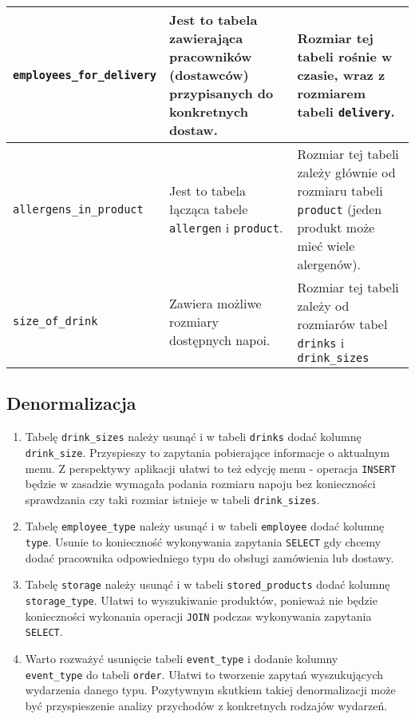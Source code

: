 \documentclass[12pt]{article}
\begin{document}
\begin{longtable}{|p{8em}|p{9em}|p{15em}|}
    \hline
    \texttt{employees\_for\_}\newline\texttt{delivery} & Jest to tabela zawierająca pracowników (dostawców) przypisanych do konkretnych dostaw. & Rozmiar tej tabeli rośnie w czasie, wraz z rozmiarem tabeli \texttt{delivery}. \\
    \hline
    \texttt{allergens\_in\_}\newline\texttt{product} & Jest to tabela łącząca tabele \texttt{allergen} i \texttt{product}. & Rozmiar tej tabeli zależy głównie od rozmiaru tabeli \texttt{product} (jeden produkt może mieć wiele alergenów).  \\
    \hline
    \texttt{size\_of\_drink} & Zawiera możliwe rozmiary dostępnych napoi. & Rozmiar tej tabeli zależy od rozmiarów tabel \texttt{drinks} i \texttt{drink\_sizes} \\
    \hline
\end{longtable}

\pagebreak

\subsection{Denormalizacja}
\begin{enumerate}
    \item Tabelę \texttt{drink\_sizes} należy usunąć i w tabeli \texttt{drinks} dodać kolumnę \texttt{drink\_size}. Przyspieszy to zapytania pobierające informacje o aktualnym menu. Z perspektywy aplikacji ułatwi to też edycję menu - operacja \texttt{INSERT} będzie w zasadzie wymagała podania rozmiaru napoju bez konieczności sprawdzania czy taki rozmiar istnieje w tabeli \texttt{drink\_sizes}.
    
    \item Tabelę \texttt{employee\_type} należy usunąć i w tabeli \texttt{employee} dodać kolumnę \texttt{type}. Usunie to konieczność wykonywania zapytania \texttt{SELECT} gdy chcemy dodać pracownika odpowiedniego typu do obsługi zamówienia lub dostawy.
    
    \item Tabelę \texttt{storage} należy usunąć i w tabeli \texttt{stored\_products} dodać kolumnę \texttt{storage\_type}. Ułatwi to wyszukiwanie produktów, ponieważ nie będzie konieczności wykonania operacji \texttt{JOIN} podczas wykonywania zapytania \texttt{SELECT}.
    
    \item Warto rozważyć usunięcie tabeli \texttt{event\_type} i dodanie kolumny \\ \texttt{event\_type} do tabeli \texttt{order}. Ułatwi to tworzenie zapytań wyszukujących wydarzenia danego typu. Pozytywnym skutkiem takiej denormalizacji może być przyspieszenie analizy przychodów z konkretnych rodzajów wydarzeń.
\end{enumerate}
\end{document}
